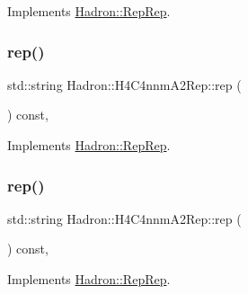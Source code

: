 Implements \mbox{\hyperlink{structHadron_1_1RepRep_ab3213025f6de249f7095892109575fde}{Hadron\+::\+Rep\+Rep}}.

\mbox{\label{structHadron_1_1H4C4nnmA2Rep_a8a7be6ed1396d06723b3d7891b6ab5a8}} 
\subsubsection{\texorpdfstring{rep()}{rep()}\hspace{0.1cm}{\footnotesize\ttfamily [2/5]}}
{\footnotesize\ttfamily std\+::string Hadron\+::\+H4\+C4nnm\+A2\+Rep\+::rep (\begin{DoxyParamCaption}{ }\end{DoxyParamCaption}) const\hspace{0.3cm}{\ttfamily [inline]}, {\ttfamily [virtual]}}



Implements \mbox{\hyperlink{structHadron_1_1RepRep_ab3213025f6de249f7095892109575fde}{Hadron\+::\+Rep\+Rep}}.

\mbox{\label{structHadron_1_1H4C4nnmA2Rep_a8a7be6ed1396d06723b3d7891b6ab5a8}} 
\subsubsection{\texorpdfstring{rep()}{rep()}\hspace{0.1cm}{\footnotesize\ttfamily [3/5]}}
{\footnotesize\ttfamily std\+::string Hadron\+::\+H4\+C4nnm\+A2\+Rep\+::rep (\begin{DoxyParamCaption}{ }\end{DoxyParamCaption}) const\hspace{0.3cm}{\ttfamily [inline]}, {\ttfamily [virtual]}}



Implements \mbox{\hyperlink{structHadron_1_1RepRep_ab3213025f6de249f7095892109575fde}{Hadron\+::\+Rep\+Rep}}.

\mbox{\label{structHadron_1_1H4C4nnmA2Rep_a8a7be6ed1396d06723b3d7891b6ab5a8}} 
